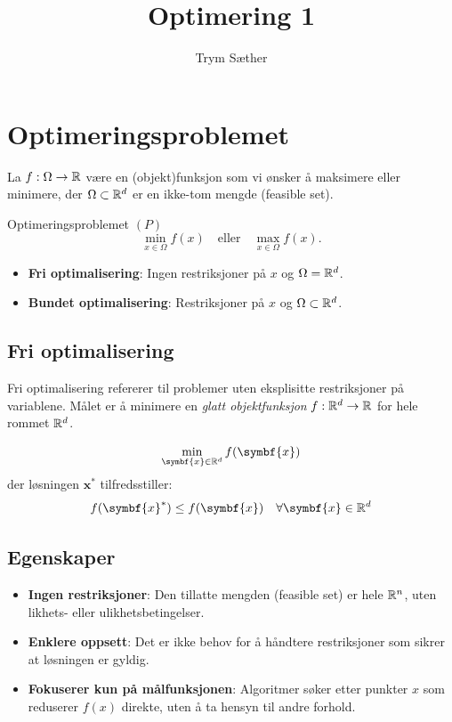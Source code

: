 \documentclass[10pt, a4paper]{article}
\begin{document}
\sloppy

\title{Optimering 1}

\author{Trym Sæther}

\maketitle

\tableofcontents

\newpage

\section{Optimeringsproblemet}
La \(f: \Omega \to \mathbb{R}\) være en (objekt)funksjon som vi ønsker å maksimere eller minimere, der \(\Omega \subset \mathbb{R}^d\) er en ikke-tom mengde (feasible set).

\begin{definition}{Optimeringsproblemet \((P)\)}{}
  \[
    \min_{x \in \Omega} f(x) \quad \text{eller} \quad \max_{x \in \Omega} f(x).
  \]\label{def:optimization_problem}

  \begin{itemize}
    \item \textbf{Fri optimalisering}: Ingen restriksjoner på \(x\) og \(\Omega = \mathbb{R}^d\).
    \item \textbf{Bundet optimalisering}: Restriksjoner på \(x\) og \(\Omega \subset \mathbb{R}^d\).
  \end{itemize}

\end{definition}

\subsection{Fri optimalisering}

Fri optimalisering refererer til problemer uten eksplisitte restriksjoner på variablene.
Målet er å minimere en \textit{glatt objektfunksjon} \( f : \mathbb{R}^d \to \mathbb{R} \) for hele rommet \( \mathbb{R}^d \).

\[
  \min_{\symbf{x} \in \R^d} f(\symbf{x})
\]
der løsningen \( \symbf{x}^* \) tilfredsstiller:
\[
  f(\symbf{x}^*) \leq f(\symbf{x}) \quad \forall \symbf{x} \in \R^d
\]

\subsection*{Egenskaper}

\begin{itemize}
  \item \textbf{Ingen restriksjoner}: Den tillatte mengden (feasible set) er hele \( \mathbb{R}^n \), uten likhets- eller ulikhetsbetingelser.
  \item \textbf{Enklere oppsett}: Det er ikke behov for å håndtere restriksjoner som sikrer at løsningen er gyldig.
  \item \textbf{Fokuserer kun på målfunksjonen}: Algoritmer søker etter punkter \( x \) som reduserer \( f(x) \) direkte, uten å ta hensyn til andre forhold.
\end{itemize}
\end{document}
